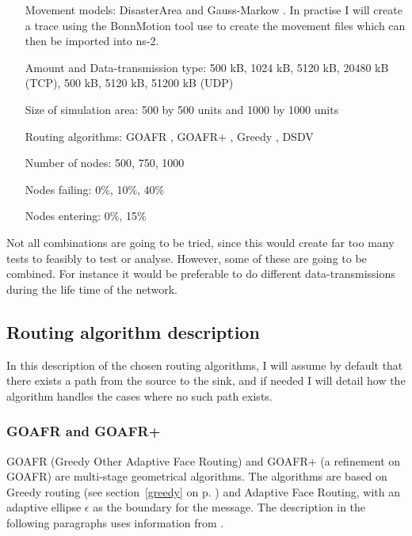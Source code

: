 \begin{itemize}
\item[Movement models:] DisasterArea \cite{disasterArea} and Gauss-Markow . In practise I will create a trace using the BonnMotion tool \cite{toilers} use to create the movement files which can then be imported into ns-2.
\item[Amount and Data-transmission type:] 500 kB, 1024 kB, 5120 kB, 20480 kB (TCP), 500 kB, 5120 kB, 51200 kB (UDP)
\item[Size of simulation area:] 500 by 500 units and 1000 by 1000 units
\item[Routing algorithms:] GOAFR \cite{gopher}, GOAFR+ \cite{gopher+}, Greedy \cite{gopher}, DSDV 
\item[Number of nodes:] 500, 750, 1000
\item[Nodes failing:] 0\%, 10\%, 40\%
\item[Nodes entering:] 0\%, 15\%
\end{itemize}

Not all combinations are going to be tried, since this would create far too many tests to feasibly to test or analyse. However, some of these are going to be combined. For instance it would be preferable to do different data-transmissions during the life time of the network.

\subsection{Routing algorithm description}
In this description of the chosen routing algorithms, I will assume by default that there exists a path from the source to the sink, and if needed I will detail how the algorithm handles the cases where no such path exists.

\subsubsection{GOAFR and GOAFR+}


GOAFR \cite{gopher} (Greedy Other Adaptive Face Routing) and GOAFR+ \cite{gopher+} (a refinement on GOAFR) are multi-stage geometrical algorithms. The algorithms are based on Greedy routing (see section~\ref{greedy} on p. \pageref{greedy}) and Adaptive Face Routing, with an adaptive ellipse $\epsilon$ as the boundary for the message. The description in the following paragraphs uses information from \cite{gopher}.

